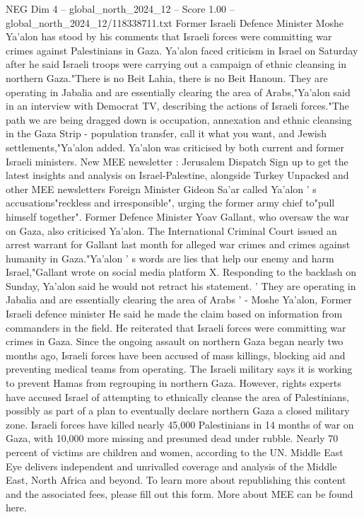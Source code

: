 \begin{textsample}{NEG Dim 4 – global\_north\_2024\_12 – Score 1.00 – global\_north\_2024\_12/118338711.txt}  \label{ex:f4_neg_134}
Former Israeli Defence Minister Moshe Ya'alon has stood by his comments that Israeli forces were committing war crimes against Palestinians in Gaza.
Ya'alon faced criticism in Israel on Saturday after he said Israeli troops were carrying out a campaign of ethnic cleansing in northern Gaza."There is no Beit Lahia, there is no Beit Hanoun.
They are operating in Jabalia and are essentially clearing the area of Arabs,"Ya'alon said in an interview with Democrat TV, describing the actions of Israeli forces."The path we are being dragged down is occupation, annexation and ethnic cleansing in the Gaza Strip - population transfer, call it what you want, and Jewish settlements,"Ya'alon added.
Ya'alon was criticised by both current and former Israeli ministers.
New MEE newsletter : Jerusalem Dispatch Sign up to get the latest insights and analysis on Israel-Palestine, alongside Turkey Unpacked and other MEE newsletters Foreign Minister Gideon Sa'ar called Ya'alon ' s accusations"reckless and irresponsible", urging the former army chief to"pull himself together".
Former Defence Minister Yoav Gallant, who oversaw the war on Gaza, also criticised Ya'alon.
The International Criminal Court issued an arrest warrant for Gallant last month for alleged war crimes and crimes against humanity in Gaza."Ya'alon ' s words are lies that help our enemy and harm Israel,"Gallant wrote on social media platform X.
Responding to the backlash on Sunday, Ya'alon said he would not retract his statement. ' They are operating in Jabalia and are essentially clearing the area of Arabs ' - Moshe Ya'alon, Former Israeli defence minister He said he made the claim based on information from commanders in the field.
He reiterated that Israeli forces were committing war crimes in Gaza.
Since the ongoing assault on northern Gaza began nearly two months ago, Israeli forces have been accused of mass killings, blocking aid and preventing medical teams from operating.
The Israeli military says it is working to prevent Hamas from regrouping in northern Gaza.
However, rights experts have accused Israel of attempting to ethnically cleanse the area of Palestinians, possibly as part of a plan to eventually declare northern Gaza a closed military zone.
Israeli forces have killed nearly 45,000 Palestinians in 14 months of war on Gaza, with 10,000 more missing and presumed dead under rubble.
Nearly 70 percent of victims are children and women, according to the UN.
Middle East Eye delivers independent and unrivalled coverage and analysis of the Middle East, North Africa and beyond.
To learn more about republishing this content and the associated fees, please fill out this form.
More about MEE can be found here.

\end{textsample}
